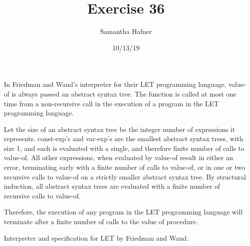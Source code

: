 \documentclass[12pt]{article}
\title{Exercise 36}
\author{Samantha Hafner}
\date{10/13/19}
\begin{document}
\maketitle


In Friedman and Wand's interpreter for their LET programming language, value-of is always passed an abstract syntax tree. The function is called at most one time from a non-recursive call in the execution of a program in the LET programming language.

Let the size of an abstract syntax tree be the integer number of expressions it represents. const-exp's and var-exp's are the smallest abstract syntax trees, with size 1, and each is evaluated with a single, and therefore finite number of calls to value-of. All other expressions, when evaluated by value-of result in either an error, terminating early with a finite number of calls to value-of, or in one or two recursive calls to value-of on a strictly smaller abstract syntax tree. By structural induction, all abstract syntax trees are evaluated with a finite number of recursive calls to value-of.

Therefore, the execution of any program in the LET programming language will terminate after a finite number of calls to the value of procedure.

Interpreter and specification for LET by Friedman and Wand.
\end{document}
